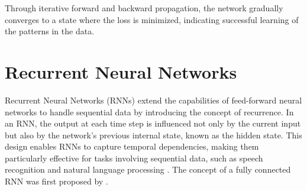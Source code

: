 \documentclass[12pt, a4paper, headinclude, twoside, plainheadsepline, open=right, numbers=noenddot, hidelinks, toc=listof, toc=bibliography]{scrreprt}
\begin{document}
Through iterative forward and backward propagation, the network gradually converges to a state where the loss is minimized, indicating successful learning of the patterns in the data.

\section{Recurrent Neural Networks}
\label{sec:rnn}

Recurrent Neural Networks (RNNs) extend the capabilities of feed-forward neural networks to handle sequential data by introducing the concept of recurrence. In an RNN, the output at each time step is influenced not only by the current input but also by the network's previous internal state, known as the hidden state. This design enables RNNs to capture temporal dependencies, making them particularly effective for tasks involving sequential data, such as speech recognition and natural language processing \cite{lecunDeepLearning2015}.
%
%
%
%
%
%
The concept of a fully connected RNN was first proposed by \citeauthor{elmanFindingStructureTime1990} \cite{elmanFindingStructureTime1990}.
\end{document}
